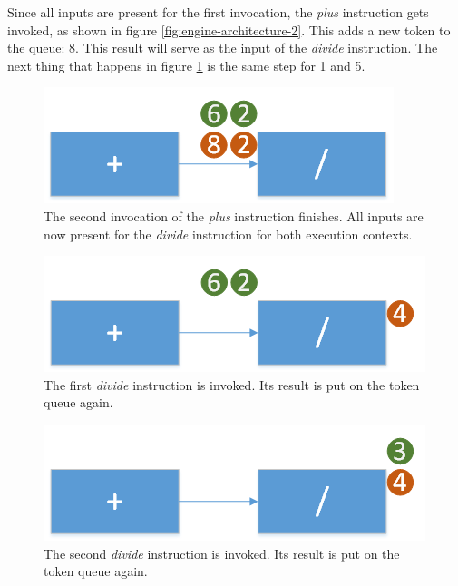 Since all inputs are present for the first invocation, the \textit{plus} instruction gets invoked, as shown in figure \ref{fig:engine-architecture-2}. This adds a new token to the queue: 8. This result will serve as the input of the \textit{divide} instruction. 
The next thing that happens in figure \ref{fig:engine-architecture-3} is the same step for 1 and 5.

\begin{figure}[h!]
	\centering
	\includegraphics[scale=0.8]{images/Engine-Architecture-3.png}
	\caption{The second invocation of the \textit{plus} instruction finishes. All inputs are now present for the \textit{divide} instruction for both execution contexts.}
	\label{fig:engine-architecture-3}
\end{figure}

\begin{figure}[h!]
	\centering
	\includegraphics[scale=0.8]{images/Engine-Architecture-4.png}
	\caption{The first \textit{divide} instruction is invoked. Its result is put on the token queue again.}
	\label{fig:engine-architecture-4}
\end{figure} 

\begin{figure}[h!]
	\centering
	\includegraphics[scale=0.8]{images/Engine-Architecture-5.png}
	\caption{The second \textit{divide} instruction is invoked. Its result is put on the token queue again.}
	\label{fig:engine-architecture-5}
\end{figure}

